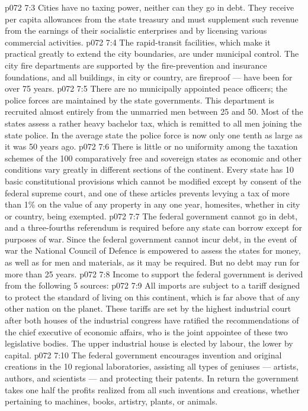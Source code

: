 \vs p072 7:3 \pc Cities have no taxing power, neither can they go in debt. They receive per capita allowances from the state treasury and must supplement such revenue from the earnings of their socialistic enterprises and by licensing various commercial activities.
\vs p072 7:4 The rapid\hyp{}transit facilities, which make it practical greatly to extend the city boundaries, are under municipal control. The city fire departments are supported by the fire\hyp{}prevention and insurance foundations, and all buildings, in city or country, are fireproof --- have been for over 75 years.
\vs p072 7:5 There are no municipally appointed peace officers; the police forces are maintained by the state governments. This department is recruited almost entirely from the unmarried men between 25 and 50. Most of the states assess a rather heavy bachelor tax, which is remitted to all men joining the state police. In the average state the police force is now only one tenth as large as it was 50 years ago.
\vs p072 7:6 \pc There is little or no uniformity among the taxation schemes of the 100 comparatively free and sovereign states as economic and other conditions vary greatly in different sections of the continent. Every state has 10 basic constitutional provisions which cannot be modified except by consent of the federal supreme court, and one of these articles prevents levying a tax of more than 1\% on the value of any property in any one year, homesites, whether in city or country, being exempted.
\vs p072 7:7 The federal government cannot go in debt, and a three\hyp{}fourths referendum is required before any state can borrow except for purposes of war. Since the federal government cannot incur debt, in the event of war the National Council of Defence is empowered to assess the states for money, as well as for men and materials, as it may be required. But no debt may run for more than 25 years.
\vs p072 7:8 \pc Income to support the federal government is derived from the following 5 sources:
\vs p072 7:9 \bibnobreakspace {} All imports are subject to a tariff designed to protect the standard of living on this continent, which is far above that of any other nation on the planet. These tariffs are set by the highest industrial court after both houses of the industrial congress have ratified the recommendations of the chief executive of economic affairs, who is the joint appointee of these two legislative bodies. The upper industrial house is elected by labour, the lower by capital.
\vs p072 7:10 \bibnobreakspace {} The federal government encourages invention and original creations in the 10 regional laboratories, assisting all types of geniuses --- artists, authors, and scientists --- and protecting their patents. In return the government takes one half the profits realized from all such inventions and creations, whether pertaining to machines, books, artistry, plants, or animals.
